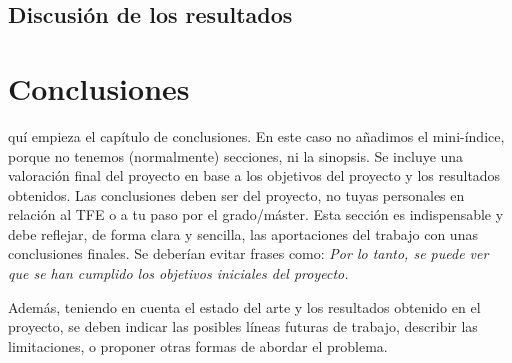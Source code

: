\documentclass[a4paper,11pt,leqno, twoside]{memoir}
\begin{document}
\section{Discusión de los resultados}
\label{sec:discusion}


\clearemptydoublepage
\chapter{Conclusiones}
\label{cap:conclusiones}
quí empieza el capítulo de conclusiones. En este caso no añadimos el mini-índice, porque no tenemos (normalmente) secciones, ni la sinopsis. Se incluye una valoración final del proyecto en base a los objetivos del proyecto y los resultados obtenidos. Las conclusiones deben ser del proyecto, no tuyas personales en relación al TFE o a tu paso por el grado/máster.
Esta sección es indispensable y debe reflejar, de forma clara y sencilla, las aportaciones del trabajo con unas conclusiones finales. Se deberían evitar frases como: \textit{Por lo tanto, se puede ver que se han cumplido los objetivos iniciales del proyecto.}

Además, teniendo en cuenta el estado del arte y los resultados obtenido en el proyecto, se deben indicar las posibles líneas futuras de trabajo, describir las limitaciones, o proponer otras formas de abordar el problema.


%
%
\backmatter


\clearemptydoublepage



%
%
 
\end{document}
